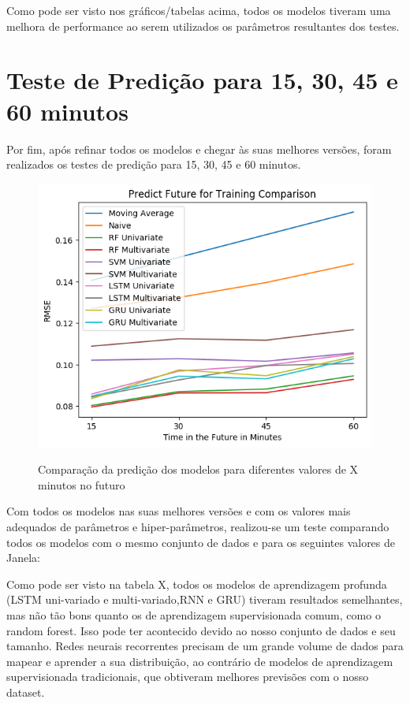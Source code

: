 
Como pode ser visto nos gráficos/tabelas acima, todos os modelos tiveram uma melhora de performance ao serem utilizados os parâmetros resultantes dos testes.

\section{Teste de Predição para 15, 30, 45 e 60 minutos}

Por fim, após refinar todos os modelos e chegar às suas melhores versões, foram realizados os testes de predição para 15, 30, 45 e 60 minutos.

\begin{figure}[htbp]
    \centering
    \includegraphics[scale=0.8]{monography/img/predict_future_for_training_comparison_rmse.png}
    \label{figure:res_future}
    \caption{Comparação da predição dos modelos para diferentes valores de X minutos no futuro}
\end{figure}


Com todos os modelos nas suas melhores versões e com os valores mais adequados de parâmetros e hiper-parâmetros, realizou-se um teste comparando todos os modelos com o mesmo conjunto de dados e para os seguintes valores de Janela: 


Como pode ser visto na tabela X,  todos  os  modelos  de aprendizagem  profunda  (LSTM  uni-variado  e  multi-variado,RNN  e  GRU)  tiveram  resultados  semelhantes,  mas  não  tão bons quanto os de aprendizagem supervisionada comum, como o random forest. Isso  pode  ter  acontecido  devido  ao  nosso  conjunto  de dados  e  seu  tamanho.  Redes  neurais  recorrentes  precisam de  um  grande  volume  de  dados  para  mapear  e  aprender  a sua  distribuição,  ao  contrário  de  modelos  de  aprendizagem supervisionada  tradicionais, que obtiveram melhores previsões com o nosso dataset.

